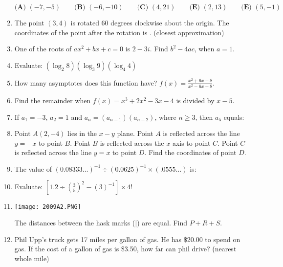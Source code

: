 \documentclass[../uilmath.tex]{subfiles}
\begin{document}
\begin{enumerate}[label=\bfseries\arabic*.]
        $\textbf{(A) } (-7,-5) \qquad \textbf{(B) } (-6,-10) \qquad \textbf{(C) } (4,21) \qquad \textbf{(E) } (2,13) \qquad \textbf{(E) } (5,-1)$

        \item %
        The point $(3,4)$ is rotated 60 degrees clockwise about the origin. The coordinates of the point after the rotation is \blank. (closest approximation)

        \item %
        One of the roots of $ax^2+bx+c=0$ is $2-3i$. Find $b^2-4ac$, when $a=1$.

        \item %
        Evaluate: $(\log_2 8)(\log_3 9)(\log_4 4)$
    
        \item %
        How many asymptotes does this function have? $f(x)=\frac{x^2+6x+8}{x^2-6x+8}$.

        \item %
        Find the remainder when $f(x)=x^3+2x^2-3x-4$ is divided by $x-5$.

        \item %
        If $a_1=-3$, $a_2=1$ and $a_n=(a_{n-1})(a_{n-2})$, where $n\geq 3$, then $a_5$ equals:

        \item %
        Point $A(2,-4)$ lies in the $x-y$ plane. Point $A$ is reflected across the line $y=-x$ to point $B$. Point $B$ is reflected across the $x$-axis to point $C$.
        Point $C$ is reflected across the line $y=x$ to point $D$. Find the coordinates of point $D$.

        \item %
        The value of $(0.08333\dots)^{-1}\div (0.0625)^{-1}\times(.0555\dots)$ is:

        \item %
        Evaluate: $[1.2\div (\frac{3}{5})^2-(3)^{-1}]\times4!$

        \item %
        \begin{center}
            \texttt{[image: 2009A2.PNG]}
        \end{center}
        The distances between the hask marks (|) are equal. Find $P+R+S$.

        \item %
        Phil Upp's truck gets 17 miles per gallon of gas. He has \$20.00 to spend on gas. If the cost of a gallon of gas is \$3.50, how far can phil drive? (nearest whole mile)


\end{enumerate}
\end{document}
